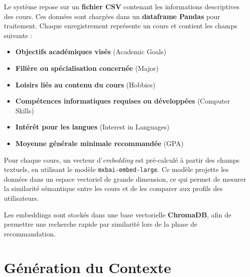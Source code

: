 Le système repose sur un \textbf{fichier CSV} contenant les informations descriptives des cours. Ces données sont chargées dans un \textbf{dataframe Pandas} pour traitement. Chaque enregistrement représente un cours et contient les champs suivants :

\begin{itemize}
    \item \textbf{Objectifs académiques visés} (Academic Goals)
    \item \textbf{Filière ou spécialisation concernée} (Major)
    \item \textbf{Loisirs liés au contenu du cours} (Hobbies)
    \item \textbf{Compétences informatiques requises ou développées} (Computer Skills)
    \item \textbf{Intérêt pour les langues} (Interest in Languages)
    \item \textbf{Moyenne générale minimale recommandée} (GPA)
\end{itemize}

Pour chaque cours, un vecteur d'\textit{embedding} est pré-calculé à partir des champs textuels, en utilisant le modèle \texttt{mxbai-embed-large}. Ce modèle projette les données dans un espace vectoriel de grande dimension, ce qui permet de mesurer la similarité sémantique entre les cours et de les comparer aux profils des utilisateurs.

Les embeddings sont stockés dans une base vectorielle \textbf{ChromaDB}, afin de permettre une recherche rapide par similarité lors de la phase de recommandation.

\section{Génération du Contexte}
